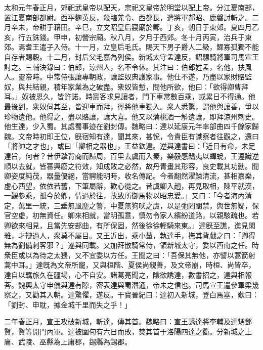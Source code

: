 \begin{pinyinscope}
太和元年春正月，郊祀武皇帝以配天，宗祀文皇帝於明堂以配上帝。分江夏南部，置江夏南部都尉。西平麴英反，殺臨羌令、西都長，遣將軍郝昭、鹿磐討斬之。二月辛未，帝耕于藉田。辛巳，立文昭皇后寢廟於鄴。丁亥，朝日于東郊。夏四月乙亥，行五銖錢。甲申，初營宗廟。秋八月，夕月于西郊。冬十月丙寅，治兵于東郊。焉耆王遣子入侍。十一月，立皇后毛氏。賜天下男子爵人二級，鰥寡孤獨不能自存者賜穀。十二月，封后父毛嘉為列侯。新城太守孟達反，詔驃騎將軍司馬宣王討之。三輔決錄曰：伯郎，涼州人，名不令休。其注曰：伯郎姓孟，名他，扶風人。靈帝時。中常侍張讓專朝政，讓監奴典護家事。他仕不遂，乃盡以家財賂監奴，與共結親，積年家業為之破盡。衆奴皆慙，問他所欲，他曰：「欲得卿曹拜耳。」奴被恩久，皆許諾。時賔客求見讓者，門下車常數百乘，或累日不得通。他最後到，衆奴伺其至，皆迎車而拜，徑將他車獨入。衆人悉驚，謂他與讓善，爭以珍物遺他。他得之，盡以賂讓，讓大喜。他又以蒲桃酒一斛遺讓，即拜涼州刺史。他生達，少入蜀。其處蜀事迹在劉封傳。魏略曰：達以延康元年率部曲四千餘家歸魏。文帝時初即王位，旣宿知有達，聞其來，甚恱，令貴臣有識察者往觀之，還曰「將帥之才也」，或曰「卿相之器也」，王益欽達。逆與達書曰：「近日有命，未足達旨，何者？昔伊摯背商而歸周，百里去虞而入秦，樂毅感鴟夷以蟬蛻，王遵識逆順以去就，皆審興廢之符效，知成敗之必然，故丹青畫其形容，良史載其功勳。聞卿姿度純茂，器量優絕，當騁能明時，收名傳記。今者翻然濯鱗清流，甚相嘉樂，虛心西望，依依若舊，下筆屬辭，歡心從之。昔虞卿入趙，再見取相，陳平就漢，一覲參乘，孤今於卿，情過於往，故致所御馬物以昭忠愛。」又曰：「今者海內清定，萬里一統，三垂無風塵之警，中夏無狗吠之虞，以是弛罔闊禁，與世無疑，保官空虛，初無資任。卿來相就，當明孤意，慎勿令家人繽紛道路，以親駭疏也。若卿欲來相見，且當先安部曲，有所保固，然後徐徐輕騎來東。」達旣至譙，進見閑雅，才辯過人，衆莫不屬目。又王近出，乘小輦，執達手，撫其背戲之曰：「卿得無為劉備刺客邪？」遂與同載。又加拜散騎常侍，領新城太守，委以西南之任。時衆臣或以為待之太猥，又不宜委以方任。王聞之曰：「吾保其無他，亦譬以蒿箭射蒿中耳。」達旣為文帝所寵，又與桓階、夏侯尚親善，及文帝崩，時桓、尚皆卒，達自以羈旅久在疆場，心不自安。諸葛亮聞之，陰欲誘達，數書招之，達與相報荅。魏興太守申儀與達有隙，密表達與蜀潛通，帝未之信也。司馬宣王遣參軍梁幾察之，又勸其入朝。達驚懼，遂反。干寶晉紀曰：達初入新城，登白馬塞，歎曰：「劉封、申耽，據金城千里而失之乎！」

二年春正月，宣王攻破新城，斬達，傳其首。魏略曰：宣王誘達將李輔及達甥鄧賢，賢等開門內軍。達被圍旬有六日而敗，焚其首于洛陽四達之衢。分新城之上庸、武陵、巫縣為上庸郡，錫縣為錫郡。


\end{pinyinscope}
